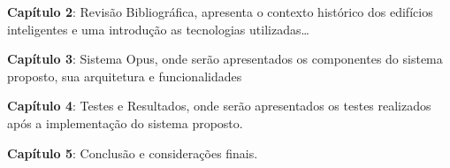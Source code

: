 \textbf{Capítulo 2}: Revisão Bibliográfica, apresenta o contexto histórico dos edifícios inteligentes e uma introdução 
as tecnologias utilizadas\dots

\textbf{Capítulo 3}: Sistema Opus, onde serão apresentados os componentes
do sistema proposto, sua arquitetura e funcionalidades

\textbf{Capítulo 4}: Testes e Resultados, onde serão apresentados os testes realizados após a
implementação do sistema proposto.

\textbf{Capítulo 5}: Conclusão e considerações finais.